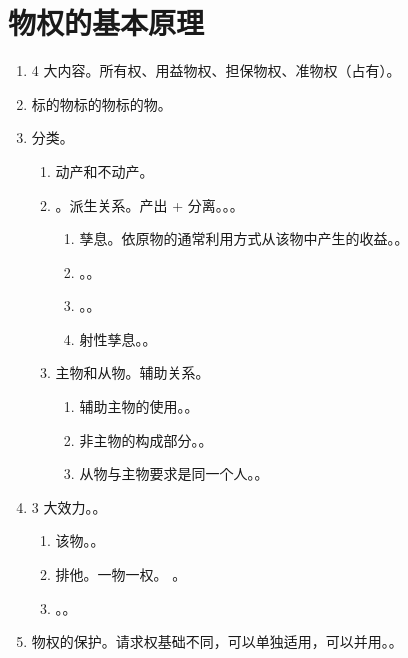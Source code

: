 \section{物权的基本原理}
\begin{enumerate}
  \item 4 大内容。所有权、用益物权、担保物权、准物权（占有）。
  \item 标的物标的物标的物。
  \item 分类。
        \begin{enumerate}
          \item 动产和不动产。
          \item {}。派生关系。产出 + 分离。。。
                \begin{enumerate}
                  \item 孳息。依原物的通常利用方式从该物中产生的收益。。
                  \item {}。。
                  \item {}。。
                  \item 射性孳息。。
                \end{enumerate}
          \item 主物和从物。辅助关系。
                \begin{enumerate}
                  \item 辅助主物的使用。。
                  \item 非主物的构成部分。。
                  \item 从物与主物要求是同一个人。。
                \end{enumerate}
        \end{enumerate}
  \item 3 大效力。。
        \begin{enumerate}
          \item {}该物。。
          \item 排他。一物一权。 \yjt {}。
          \item {}。。
        \end{enumerate}
  \item 物权的保护。请求权基础不同，可以单独适用，可以并用。。

\end{enumerate}
